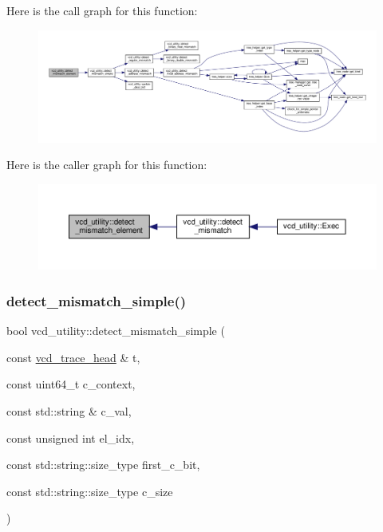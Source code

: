 Here is the call graph for this function\+:
\nopagebreak
\begin{figure}[H]
\begin{center}
\leavevmode
\includegraphics[width=350pt]{d8/d51/classvcd__utility_a83e132ad97a12d201e14274c167bb2b6_cgraph}
\end{center}
\end{figure}
Here is the caller graph for this function\+:
\nopagebreak
\begin{figure}[H]
\begin{center}
\leavevmode
\includegraphics[width=350pt]{d8/d51/classvcd__utility_a83e132ad97a12d201e14274c167bb2b6_icgraph}
\end{center}
\end{figure}
\mbox{\label{classvcd__utility_a96a0270243835db1afab5b8c82e3b320}} 
\subsubsection{\texorpdfstring{detect\+\_\+mismatch\+\_\+simple()}{detect\_mismatch\_simple()}}
{\footnotesize\ttfamily bool vcd\+\_\+utility\+::detect\+\_\+mismatch\+\_\+simple (\begin{DoxyParamCaption}\item[{const \hyperlink{structvcd__trace__head}{vcd\+\_\+trace\+\_\+head} \&}]{t,  }\item[{const uint64\+\_\+t}]{c\+\_\+context,  }\item[{const std\+::string \&}]{c\+\_\+val,  }\item[{const unsigned int}]{el\+\_\+idx,  }\item[{const std\+::string\+::size\+\_\+type}]{first\+\_\+c\+\_\+bit,  }\item[{const std\+::string\+::size\+\_\+type}]{c\+\_\+size }\end{DoxyParamCaption})\hspace{0.3cm}{\ttfamily [protected]}}



